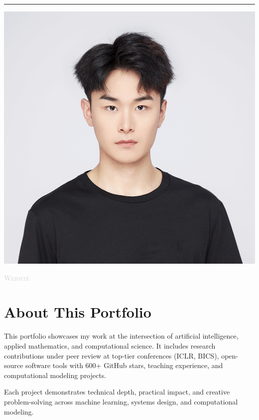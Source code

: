 \begin{center}
\begin{minipage}[t]{0.6\textwidth}
  \vspace{0.35em}
  
  \textcolor{Accent}{\rule{\linewidth}{2pt}}
  
\end{minipage}\hfill
\begin{minipage}[t]{0.35\textwidth}
  \raggedleft
  \vspace{0pt}
  
  \includegraphics[width=0.76\linewidth]{assets/headshot.jpg}
  
  \vspace{0.5em}
  
  
  \vspace{0.2em}
  
  {\footnotesize\textcolor{LightGray}{\textsc{Website}}}
\end{minipage}

\vspace{2.4em}

\begin{minipage}{0.85\textwidth}
  \raggedright
  
  \section*{About This Portfolio}
  
  This portfolio showcases my work at the intersection of artificial intelligence, applied mathematics, and computational science. It includes research contributions under peer review at top-tier conferences (ICLR, BICS), open-source software tools with 600+ GitHub stars, teaching experience, and computational modeling projects.
  
  \vspace{0.5em}
  
  Each project demonstrates technical depth, practical impact, and creative problem-solving across machine learning, systems design, and computational modeling.
  
\end{minipage}

\end{center}

